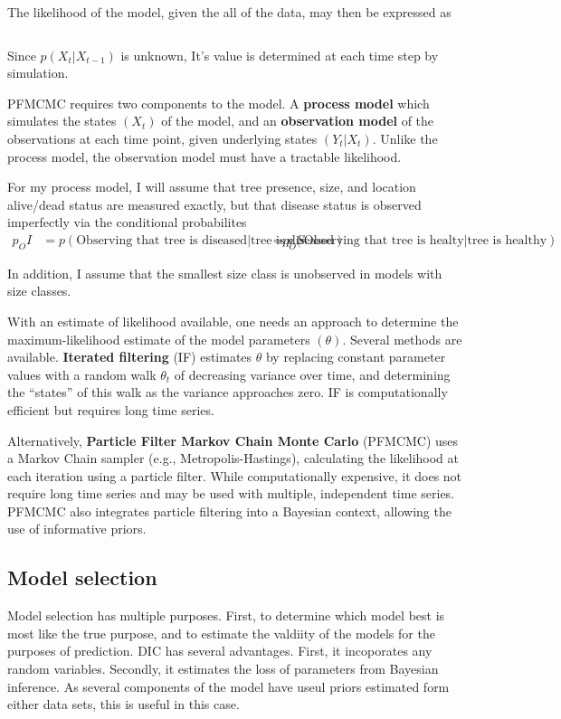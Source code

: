 \documentclass[english,nohyper,nofonts,nobib,nols,twoside]{tufte-handout}
\renewcommand\citep\cite
\begin{document}
The likelihood of the model, given the all of the data, may then be
expressed as

\[ \] \citep{Arulampalam2002}

Since $p(X_t \vert  X_{t-1})$ is unknown, It's value is determined at
each time step by simulation.

PFMCMC requires two components to the model. A \textbf{process model}
which simulates the states $(X_t)$ of the model, and an
\textbf{observation model} of the observations at each time point, given
underlying states $(Y_t \vert  X_t)$. Unlike the process model, the
observation model must have a tractable likelihood.

For my process model, I will assume that tree presence, size, and
location alive/dead status are measured exactly, but that disease status
is observed imperfectly via the conditional probabilites
\[ \begin{aligned}
 p_OI &= p(\text{Observing that tree is diseased}\vert \text{tree is diseased})
 p_OS &= p(\text{Observing that tree is healty}\vert \text{tree is healthy})
\end{aligned} \]

In addition, I assume that the smallest size class is unobserved in
models with size classes.

With an estimate of likelihood available, one needs an approach to
determine the maximum-likelihood estimate of the model parameters
$(\theta)$. Several methods are available. \textbf{Iterated filtering}
(IF) estimates $\theta$ by replacing constant parameter values with a
random walk $\theta_t$ of decreasing variance over time, and determining
the ``states'' of this walk as the variance approaches zero. IF is
computationally efficient but requires long time series.

Alternatively, \textbf{Particle Filter Markov Chain Monte Carlo}
(PFMCMC) uses a Markov Chain sampler (e.g., Metropolis-Hastings),
calculating the likelihood at each iteration using a particle filter.
While computationally expensive, it does not require long time series
and may be used with multiple, independent time series. PFMCMC also
integrates particle filtering into a Bayesian context, allowing the use
of informative priors.

\subsection{Model selection}

Model selection has multiple purposes. First, to determine which model
best is most like the true purpose, and to estimate the valdiity of the
models for the purposes of prediction. DIC has several advantages.
First, it incoporates any random variables. Secondly, it estimates the
loss of parameters from Bayesian inference. As several components of the
model have useul priors estimated form either data sets, this is useful
in this case.
\end{document}
